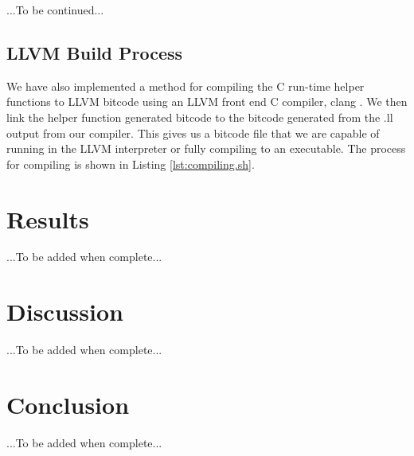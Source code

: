 \documentclass[11pt,twocolumn]{article}
\begin{document}
...To be continued...

\subsection{LLVM Build Process}

We have also implemented a method for compiling the C run-time helper
functions to LLVM bitcode using an LLVM front end C compiler, clang
\cite{clang.llvm.org}. We then link the helper function generated
bitcode to the bitcode generated from the .ll output from our
compiler. This gives us a bitcode file that we are capable of running
in the LLVM interpreter or fully compiling to an executable.  The
process for compiling is shown in Listing \ref{lst:compiling.sh}.



\section{Results}

...To be added when complete...

\section{Discussion}

...To be added when complete...

\section{Conclusion}

...To be added when complete...

\nocite{*}
\printbibliography
\end{document}
